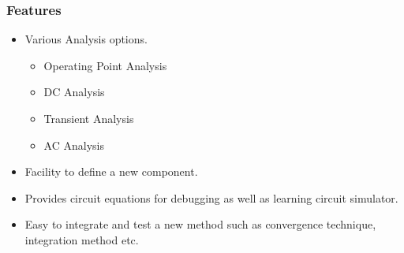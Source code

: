 \documentclass{beamer}
\begin{document}
\begin{frame}
 \frametitle{Features}
\begin{itemize}
  \item Various Analysis options.
    \begin{itemize}
      \item Operating Point Analysis
      \item DC Analysis 
      \item Transient Analysis  
      \item AC Analysis 
    \end{itemize}
  \item Facility to define a new component.
  \item Provides circuit equations for debugging as well as learning circuit simulator.
  \item {\color{red} Easy to integrate and test a new method such as convergence technique, integration method etc.} 
\end{itemize} 
\end{frame}
\end{document}
